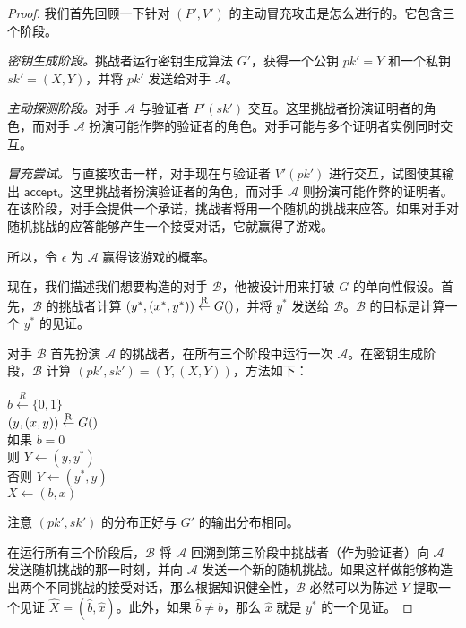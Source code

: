 \begin{proof}
我们首先回顾一下针对 $(P',V')$ 的主动冒充攻击是怎么进行的。它包含三个阶段。

\emph{密钥生成阶段。}挑战者运行密钥生成算法 $G'$，获得一个公钥 $pk'=Y$ 和一个私钥 $sk'=(X,Y)$，并将 $pk'$ 发送给对手 $\mathcal{A}$。

\emph{主动探测阶段。}对手 $\mathcal{A}$ 与验证者 $P'(sk')$ 交互。这里挑战者扮演证明者的角色，而对手 $\mathcal{A}$ 扮演可能作弊的验证者的角色。对手可能与多个证明者实例同时交互。

\emph{冒充尝试。}与直接攻击一样，对手现在与验证者 $V'(pk')$ 进行交互，试图使其输出 $\mathsf{accept}$。这里挑战者扮演验证者的角色，而对手 $\mathcal{A}$ 则扮演可能作弊的证明者。在该阶段，对手会提供一个承诺，挑战者将用一个随机的挑战来应答。如果对手对随机挑战的应答能够产生一个接受对话，它就赢得了游戏。

所以，令 $\epsilon$ 为 $\mathcal{A}$ 赢得该游戏的概率。

现在，我们描述我们想要构造的对手 $\mathcal{B}$，他被设计用来打破 $G$ 的单向性假设。首先，$\mathcal{B}$ 的挑战者计算 $(y^*,(x^*,y^*))\overset{\rm R}\leftarrow G()$，并将 $y^*$ 发送给 $\mathcal{B}$。$\mathcal{B}$ 的目标是计算一个 $y^*$ 的见证。

对手 $\mathcal{B}$ 首先扮演 $\mathcal{A}$ 的挑战者，在所有三个阶段中运行一次 $\mathcal{A}$。在密钥生成阶段，$\mathcal{B}$ 计算 $(pk',sk')=(Y,(X,Y))$，方法如下：

\vspace{8pt}

\hspace*{40pt} $b\overset{R}\leftarrow\{0,1\}$\\
\hspace*{62pt} $(y,(x,y))\overset{\rm R}\leftarrow G()$\\
\hspace*{62pt} 如果 $b=0$\\
\hspace*{82pt} 则 $Y\leftarrow(y,y^*)$\\
\hspace*{82pt} 否则 $Y\leftarrow(y^*,y)$\\
\hspace*{62pt} $X\leftarrow(b,x)$

\vspace{8pt}

\noindent
注意 $(pk',sk')$ 的分布正好与 $G'$ 的输出分布相同。

在运行所有三个阶段后，$\mathcal{B}$ 将 $\mathcal{A}$ 回溯到第三阶段中挑战者（作为验证者）向 $\mathcal{A}$ 发送随机挑战的那一时刻，并向 $\mathcal{A}$ 发送一个新的随机挑战。如果这样做能够构造出两个不同挑战的接受对话，那么根据知识健全性，$\mathcal{B}$ 必然可以为陈述 $Y$ 提取一个见证 $\widehat X=(\hat b,\hat x)$。此外，如果 $\hat b\neq b$，那么 $\hat x$ 就是 $y^*$ 的一个见证。


\end{proof}
